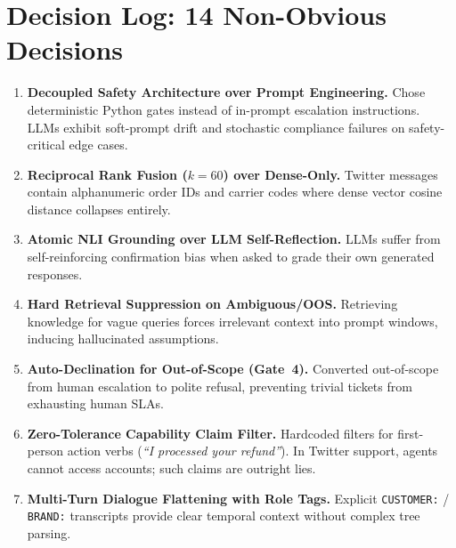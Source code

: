 \documentclass[10pt,twocolumn,a4paper]{article}
\begin{document}
\section{Decision Log: 14 Non-Obvious Decisions}\label{sec:decisions}

\begin{enumerate}[label=\textbf{\arabic*.},itemsep=3pt,leftmargin=16pt]
  \item \textbf{Decoupled Safety Architecture over Prompt Engineering.}
        Chose deterministic Python gates instead of in-prompt escalation
        instructions. LLMs exhibit soft-prompt drift and stochastic
        compliance failures on safety-critical edge cases.

  \item \textbf{Reciprocal Rank Fusion ($k{=}60$) over Dense-Only.}
        Twitter messages contain alphanumeric order IDs and carrier
        codes where dense vector cosine distance collapses entirely.

  \item \textbf{Atomic NLI Grounding over LLM Self-Reflection.}
        LLMs suffer from self-reinforcing confirmation bias when
        asked to grade their own generated responses.

  \item \textbf{Hard Retrieval Suppression on Ambiguous/OOS.}
        Retrieving knowledge for vague queries forces irrelevant context
        into prompt windows, inducing hallucinated assumptions.

  \item \textbf{Auto-Declination for Out-of-Scope (Gate~4).}
        Converted out-of-scope from human escalation to polite refusal,
        preventing trivial tickets from exhausting human SLAs.

  \item \textbf{Zero-Tolerance Capability Claim Filter.}
        Hardcoded filters for first-person action verbs
        (\textit{``I processed your refund''}). In Twitter support,
        agents cannot access accounts; such claims are outright lies.

  \item \textbf{Multi-Turn Dialogue Flattening with Role Tags.}
        Explicit \texttt{CUSTOMER:} / \texttt{BRAND:} transcripts
        provide clear temporal context without complex tree parsing.


\end{enumerate}
\end{document}
